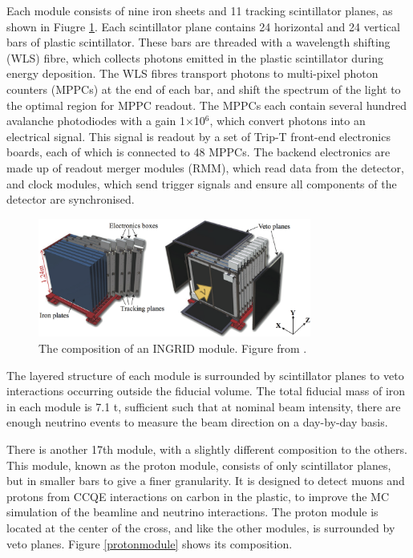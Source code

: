 Each module consists of nine iron sheets and 11 tracking scintillator planes, as shown in Fiugre \ref{ingridmodule}. Each scintillator plane contains 24 horizontal and 24 vertical bars of plastic scintillator. These bars are threaded with a wavelength shifting (WLS) fibre, which collects photons emitted in the plastic scintillator during energy deposition. The WLS fibres transport photons to multi-pixel photon counters (MPPCs) at the end of each bar, and shift the spectrum of the light to the optimal region for MPPC readout. The MPPCs each contain several hundred avalanche photodiodes with a gain 1$\times$10$^6$, which convert photons into an electrical signal. This signal is readout by a set of Trip-T front-end electronics boards\cite{tript}, each of which is connected to 48 MPPCs. The backend electronics are made up of readout merger modules (RMM), which read data from the detector, and clock modules, which send trigger signals and ensure all components of the detector are synchronised.

\begin{figure}
\centering
\includegraphics*[width=0.8\textwidth,clip]{figs/ingridmodule}
\caption{The composition of an INGRID module. Figure from \cite{tript}.} \label{ingridmodule}
\end{figure}

The layered structure of each module is surrounded by scintillator planes to veto interactions occurring outside the fiducial volume. The total fiducial mass of iron in each module is 7.1 t, sufficient such that at nominal beam intensity, there are enough neutrino events to measure the beam direction on a day-by-day basis. 

There is another 17th module, with a slightly different composition to the others. This module, known as the proton module, consists of only scintillator planes, but in smaller bars to give a finer granularity. It is designed to detect muons and protons from CCQE interactions on carbon in the plastic, to improve the MC simulation of the beamline and neutrino interactions. The proton module is located at the center of the cross, and like the other modules, is surrounded by veto planes. Figure \ref{protonmodule} shows its composition.

